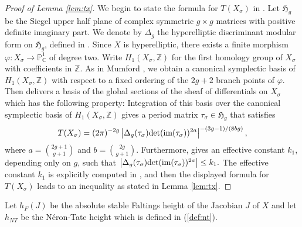\documentclass[11pt]{article}
\numberwithin{equation}{section}
\newcommand {\ZZ}  {{\mathbb Z}}
\begin{document}
\begin{proof}[Proof of Lemma \ref{lem:tx}]


We begin to state the formula for $T(X_\sigma)$ in \cite[Theorem 4.7]{dejong:riemanninvariants}.
Let $\mathfrak H_g$ be the Siegel upper half plane of complex symmetric $g\times g$ matrices with positive definite imaginary part. 
We denote by $\Delta_g$ the hyperelliptic discriminant modular form on $\mathfrak H_g$, defined in \cite[Section 5]{rvk:szpiro}. 
Since $X$ is hyperelliptic, there exists a 
finite morphism $\varphi:X_\sigma\to \mathbb P_{\mathbb C}^1$ of degree two. 
Write $H_1(X_\sigma,\ZZ)$ for the first 
homology group of $X_\sigma$ with coefficients in $\ZZ$. 
As in Mumford \cite[Chapter IIIa]{mumford:theta2}, 
we obtain a canonical symplectic basis of  $H_1(X_\sigma,\ZZ)$ with respect to a 
fixed ordering of the $2g+2$ branch points of $\varphi$. 
Then \cite[Theorem 4.7]{dejong:riemanninvariants} delivers a 
basis of the global sections of the sheaf of differentials on $X_\sigma$ which has the following property:
Integration of this basis over
the canonical symplectic basis of $H_1(X_\sigma,\ZZ)$ gives 
a period matrix $\tau_\sigma \in\mathfrak H_g$ that satisfies  
\begin{equation*}
T(X_\sigma)=(2\pi)^{-2g}\left|\Delta_g(\tau_\sigma)\textnormal{det}(\textnormal{im} (\tau_\sigma))^{2a}\right|^{-(3g-1)/(8bg)},
\end{equation*}
where $a=\binom{2g+1}{g+1}$ and $b=\binom{2g}{g+1}$. Furthermore, \cite[Lemma 5.4]{rvk:szpiro} gives an effective constant $k_1$, depending only on $g$, such that $\left|\Delta_g(\tau_\sigma)\textnormal{det}(\textnormal{im} (\tau_\sigma))^{2a}\right|\leq k_1.$
The effective constant $k_1$ is  explicitly computed in \cite[(15)]{rvk:szpiro}, and then the displayed formula for $T(X_\sigma)$ leads to an inequality as stated in Lemma \ref{lem:tx}.
\end{proof}



Let $h_F(J)$ be  the absolute stable Faltings height of the Jacobian $J$ of $X$ and let $h_{NT}$ be the N\'eron-Tate height which is defined in (\ref{def:nt}).
\end{document}
